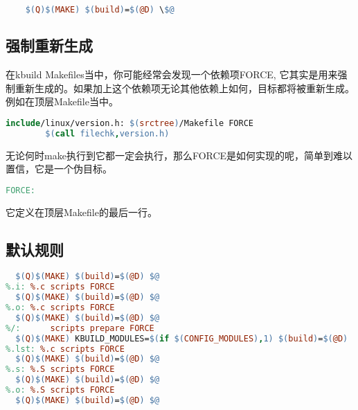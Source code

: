 \begin{lstlisting}[language=make]
%.s: %.c scripts FORCE
    $(Q)$(MAKE) $(build)=$(@D) \$@
\end{lstlisting}
\subsection{强制重新生成}
在kbuild Makefiles当中，你可能经常会发现一个依赖项FORCE, 它其实是用来强制重新生成的。如果加上这个依赖项无论其他依赖上如何，目标都将被重新生成。例如在顶层Makefile当中。
\begin{lstlisting}[language=make]
include/linux/version.h: $(srctree)/Makefile FORCE
        $(call filechk,version.h)
\end{lstlisting}
无论何时make执行到它都一定会执行，那么FORCE是如何实现的呢，简单到难以置信，它是一个伪目标。
\begin{lstlisting}[language=make]
FORCE:

\end{lstlisting}
它定义在顶层Makefile的最后一行。

\subsection{默认规则}
\begin{lstlisting}[language=make]
%.s: %.c scripts FORCE
  $(Q)$(MAKE) $(build)=$(@D) $@
%.i: %.c scripts FORCE
  $(Q)$(MAKE) $(build)=$(@D) $@
%.o: %.c scripts FORCE
  $(Q)$(MAKE) $(build)=$(@D) $@
%/:      scripts prepare FORCE
  $(Q)$(MAKE) KBUILD_MODULES=$(if $(CONFIG_MODULES),1) $(build)=$(@D)
%.lst: %.c scripts FORCE
  $(Q)$(MAKE) $(build)=$(@D) $@
%.s: %.S scripts FORCE
  $(Q)$(MAKE) $(build)=$(@D) $@
%.o: %.S scripts FORCE
  $(Q)$(MAKE) $(build)=$(@D) $@
\end{lstlisting}
